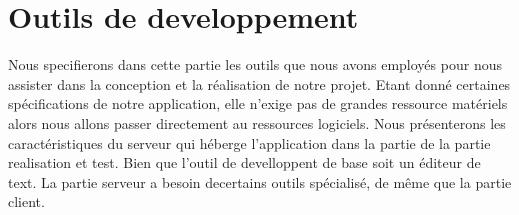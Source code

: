 \chapter{Outils de developpement}
Nous specifierons dans cette partie les outils que nous avons employés pour nous assister dans la conception et la réalisation de notre projet.
Etant donné certaines spécifications de notre application, elle n'exige pas de grandes ressource matériels alors nous allons passer directement au ressources logiciels. Nous présenterons les caractéristiques du serveur qui héberge l'application dans la partie de la partie realisation et test.
Bien que l'outil de develloppent de base soit un éditeur de text. La partie serveur a besoin decertains outils spécialisé, de même que la partie client.